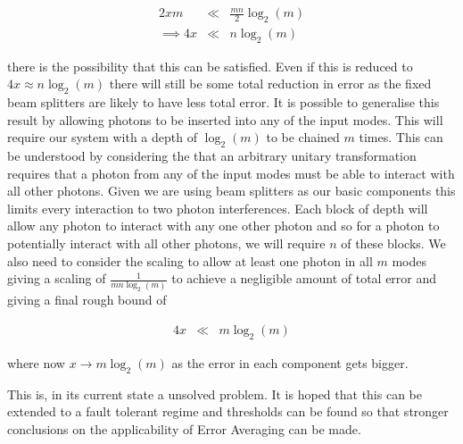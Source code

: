 \documentclass[aps,pra,twocolumn,superscriptaddress,numerical]{revtex4-1}
\begin{document}
		\begin{eqnarray}
			2xm & \ll & \frac{mn}{2}\log_{2}\left(m\right)\nonumber \\
			\implies4x & \ll & n\log_{2}\left(m\right)\label{eq:aBetterInequality}
		\end{eqnarray}
		
		
		there is the possibility that this can be satisfied. Even if this is reduced to $4x\approx n\log_{2}\left(m\right)$ there will still be some total reduction in error as the fixed beam splitters are likely to have less total error. It is possible to generalise this result by allowing photons to be inserted into any of the input modes. This	will require our system with a depth of $\log_{2}\left(m\right)$ to be chained $m$  times. This can be understood by considering the that an arbitrary unitary transformation requires that a photon from any of the  input modes must be able to interact with all other photons. Given we are using beam splitters as our basic components this limits every interaction to two photon interferences. Each block of depth  will allow any photon to interact with any one other photon and so for a photon to potentially interact with all other photons, we will require $n$ of these blocks. We also need to consider the scaling to allow at least one photon in all $m$ modes giving a scaling of $\frac{1}{mn\log_{2}\left(m\right)}$ to achieve a negligible amount of total error and giving a final rough bound of
			
		\begin{eqnarray}
			4x & \ll & m\log_{2}\left(m\right)\label{eq:aDifferentInequality}
		\end{eqnarray}
		
		
		where now $x\rightarrow m\log_{2}\left(m\right)$ as the error in each component gets bigger.
		
		This is, in its current state a unsolved problem. It is hoped that this can be extended to a fault tolerant regime and thresholds can be found so that stronger conclusions on the applicability of Error Averaging can be made.
\end{document}
